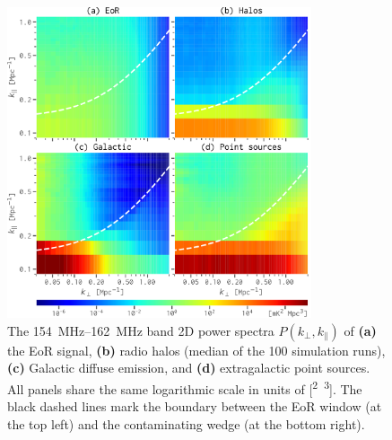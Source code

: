 \documentclass[modern]{aastex62}
\newcommand{\klos}{\text{$k_{\parallel}$}}
\newcommand{\kperp}{\text{$k_{\bot}$}}
\begin{document}
\begin{figure}
  \centering
  \includegraphics[width=0.8\textwidth]{ps2d-band158}
  \caption{\label{fig:ps2d}%
    The \SIrange{154}{162}{\MHz} band 2D power spectra
    $P(\kperp, \klos)$ of
    \textbf{(a)} the EoR signal,
    \textbf{(b)} radio halos (median of the 100 simulation runs),
    \textbf{(c)} Galactic diffuse emission,
    and
    \textbf{(d)} extragalactic point sources.
    All panels share the same logarithmic scale in units of
    [\si{\mK\squared\Mpc\cubed}].
    The black dashed lines mark the boundary between the EoR window
    (at the top left) and the contaminating wedge (at the bottom right).
  }
\end{figure}
\end{document}
